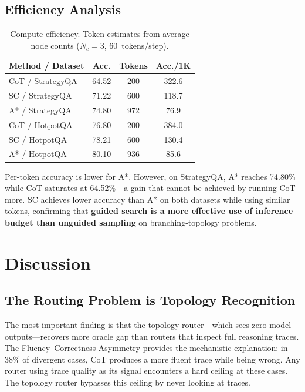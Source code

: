 \documentclass[11pt]{article}
\begin{document}
\subsection{Efficiency Analysis}
\label{sec:efficiency}

\begin{table}[t]
\centering
\caption{Compute efficiency. Token estimates from average node counts ($N_c{=}3$, 60~tokens/step).}
\label{tab:efficiency}
\small
\begin{tabular}{@{}lccc@{}}
\toprule
\textbf{Method / Dataset} & \textbf{Acc.} & \textbf{Tokens} & \textbf{Acc./1K} \\
\midrule
CoT / StrategyQA & 64.52 & 200 & 322.6 \\
SC / StrategyQA & 71.22 & 600 & 118.7 \\
A* / StrategyQA & 74.80 & 972 & 76.9 \\
\midrule
CoT / HotpotQA & 76.80 & 200 & 384.0 \\
SC / HotpotQA & 78.21 & 600 & 130.4 \\
A* / HotpotQA & 80.10 & 936 & 85.6 \\
\bottomrule
\end{tabular}
\end{table}

Per-token accuracy is lower for A*. However, on StrategyQA, A* reaches 74.80\% while CoT saturates at 64.52\%---a gain that cannot be achieved by running CoT more. SC achieves lower accuracy than A* on both datasets while using similar tokens, confirming that \textbf{guided search is a more effective use of inference budget than unguided sampling} on branching-topology problems.

\section{Discussion}
\label{sec:discussion}

\subsection{The Routing Problem is Topology Recognition}

The most important finding is that the topology router---which sees zero model outputs---recovers more oracle gap than routers that inspect full reasoning traces. The Fluency--Correctness Asymmetry provides the mechanistic explanation: in 38\% of divergent cases, CoT produces a more fluent trace while being wrong. Any router using trace quality as its signal encounters a hard ceiling at these cases. The topology router bypasses this ceiling by never looking at traces.
\end{document}
